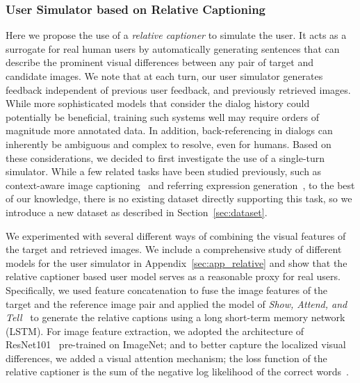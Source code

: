 \subsubsection{User Simulator based on Relative Captioning}
\label{sec:simulator}
Here we propose the use of a {\em relative captioner} to simulate the user. 
It acts as a surrogate for real human 
users by automatically generating sentences that can describe the 
prominent visual differences between any pair of target and candidate images. 
We note that at each turn, our user simulator generates feedback independent of previous user feedback, and previously retrieved images. While more sophisticated models that consider the dialog history could potentially be beneficial, training such systems well may require orders of magnitude more annotated data. In addition, back-referencing in dialogs can inherently be ambiguous and complex to resolve, even for humans. Based on these considerations, we decided to first investigate the use of a single-turn simulator. 
While a few related tasks have been studied previously, such as context-aware image captioning~\cite{vedantam2017} and referring expression generation~\cite{yu2016}, to the best of our knowledge, %
there is no existing 
dataset  directly supporting this task, so we introduce a new dataset as described in Section~\ref{sec:dataset}. 


We experimented with several different ways of combining the visual features of the target and retrieved images. We include a comprehensive study of different models for the user simulator in Appendix~\ref{sec:app_relative} and show that the relative captioner 
based user model serves as a reasonable proxy for real users.
Specifically, we used feature concatenation to fuse the image features of 
the target and the reference image pair and applied the model of {\em Show, 
Attend, and Tell}~\cite{icml2015_xuc15} to generate the relative captions
using a long short-term memory network (LSTM). 
For image feature extraction, we adopted the architecture of ResNet101~\cite{He2015}
pre-trained on ImageNet; and to better capture the localized visual differences, we added a visual attention mechanism; the loss function
of the relative captioner is the sum of the negative log likelihood of the 
correct words~\cite{icml2015_xuc15}. 
 
